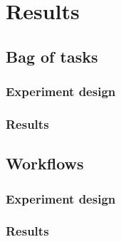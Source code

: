 \chapter{Results}
\label{chap:results} 

\section{Bag of tasks}

\subsection{Experiment design}
\subsection{Results}

\section{Workflows}

\subsection{Experiment design}
\subsection{Results}

